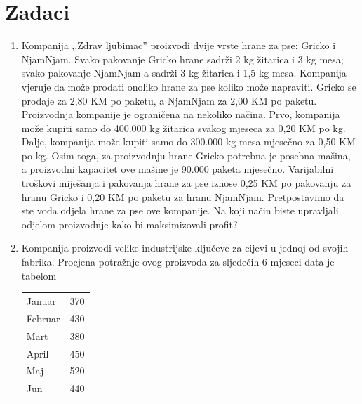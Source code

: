 \documentclass[a4paper, utf8, 11pt, colorlinks]{book}
\theoremstyle{definition}
\begin{document}
\section{Zadaci}
\begin{enumerate}
	\item  Kompanija ,,Zdrav ljubimac'' proizvodi dvije vrste hrane za pse: Gricko i NjamNjam. Svako pakovanje Gricko hrane sadrži 2 kg žitarica i 3 kg mesa; svako pakovanje NjamNjam-a sadrži 3 kg žitarica i 1,5 kg mesa. Kompanija vjeruje da može prodati onoliko hrane za pse koliko može napraviti. Gricko se prodaje za   2,80 KM po paketu, a NjamNjam  za 2,00 KM po paketu. Proizvodnja kompanije je ograničena na nekoliko načina. Prvo, kompanija može kupiti samo do 400.000 kg žitarica svakog mjeseca za 0,20 KM po kg. Dalje, kompanija može
	kupiti samo do 300.000 kg mesa mjesečno za 0,50 KM po kg. Osim toga, za proizvodnju hrane Gricko  potrebna je posebna mašina, a proizvodni kapacitet ove mašine je 90.000 paketa mjesečno. Varijabilni troškovi miješanja i pakovanja hrane za pse iznose 0,25 KM po pakovanju za hranu Gricko i 0,20 KM po paketu za hranu NjamNjam.  
	Pretpostavimo da ste vođa odjela hrane za pse  ove kompanije. Na koji način biste  upravljali odjelom proizvodnje kako bi maksimizovali profit? 
	\item %
	 Kompanija proizvodi velike industrijske ključeve za cijevi u jednoj od svojih fabrika. 
	 Procjena potražnje ovog proizvoda za sljedećih 6 mjeseci data je tabelom
 \begin{center}
    \begin{tabular}{lc}\hline
		 Januar  & 370 \\
		 Februar & 430 \\
		 Mart    & 380 \\
		 April   & 450 \\
		 Maj     & 520 \\
		 Jun     & 440 \\
		 \hline
	\end{tabular}  
\end{center}	
	

\end{enumerate}
\end{document}
